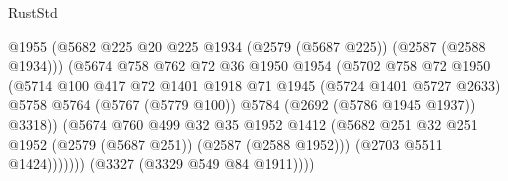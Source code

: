 \begin{lexlean}{RustStd}
\begin{coremodule}
                                        @1955
                                        (@5682
                                          @225
                                          @20
                                          @225
                                          @1934
                                          (@2579 (@5687 @225))
                                          (@2587 (@2588 @1934)))
                                        (@5674
                                          @758
                                          @762
                                          @72
                                          @36
                                          @1950
                                          @1954
                                          (@5702
                                            @758
                                            @72
                                            @1950
                                            (@5714
                                              @100
                                              @417
                                              @72
                                              @1401
                                              @1918
                                              @71
                                              @1945
                                              (@5724 @1401 @5727 @2633)
                                              @5758
                                              @5764
                                              (@5767 (@5779 @100))
                                              @5784
                                              (@2692 (@5786 @1945 @1937))
                                              @3318))
                                          (@5674
                                            @760
                                            @499
                                            @32
                                            @35
                                            @1952
                                            @1412
                                            (@5682
                                              @251
                                              @32
                                              @251
                                              @1952
                                              (@2579 (@5687 @251))
                                              (@2587 (@2588 @1952)))
                                            (@2703 @5511 @1424)))))))
                                (@3327 (@3329 @549 @84 @1911))))

\end{coremodule}
\end{lexlean}
